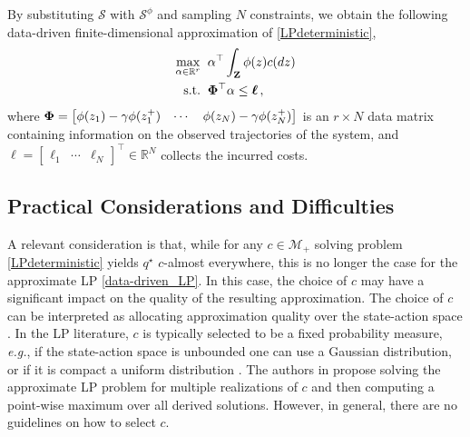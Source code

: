 \documentclass[journal,twoside,web]{ieeecolor}
\newcommand{\Zb}{\mathbf{Z}}
\newcommand{\review}{\color{black}}
\begin{document}
By substituting $\mathcal{S}$ with $\mathcal{S}^\phi$ and sampling $N$ constraints, we obtain the following data-driven finite-dimensional approximation of \eqref{LPdeterministic},
%
\begin{equation} \label{data-driven_LP} 
\begin{aligned} 
	 \max_{\alpha \in \mathbb{R}^r}  \;\; & \alpha^\top \int_{\Zb} \phi (z) c(dz) \\
	 \text{s.t.} \;\; & \bold\Phi ^\top \alpha \leq \boldsymbol\ell\,,
\end{aligned} 
\end{equation} 
%
where $\bold\Phi=\begin{bmatrix} \phi(z_1)-\gamma\phi(z_1^+) & \cdots & \phi(z_N)-\gamma\phi(z_N^+) \end{bmatrix}$ is an $r\times N$ data matrix containing information on the observed trajectories of the system, and $\boldsymbol\ell=\begin{bmatrix}
    \ell_1 & \cdots & \ell_N \end{bmatrix}^\top \in \mathbb{R}^N$ collects the incurred costs.
    
\subsection{Practical Considerations and Difficulties}

A relevant consideration is that, while for any $c\in\mathcal{M}_+$ solving problem \eqref{LPdeterministic} yields $q^\star$ $c$-almost everywhere, this is no longer the case for the approximate LP \eqref{data-driven_LP}. In this case, the choice of $c$ may have a significant impact on the quality of the resulting approximation. The choice of $c$ can be interpreted as allocating approximation quality over the state-action space \cite{deFariasLPapproach, PaulADP}. In the LP literature, $c$ is typically selected to be a {\review fixed} probability measure, \textit{e.g.}, if the state-action space is unbounded one can use a Gaussian distribution, or if it is compact a uniform distribution {\review \cite{deFariasLPapproach,CDC22_meyn,pazis2011nonparametric_alp, CogillDecentralizedADP}}. The authors in \cite{PaulADP} propose solving the approximate LP problem for multiple realizations of $c$ and then computing a point-wise maximum over all derived solutions. However, in general, there are no guidelines on how to select $c$. 
\end{document}
